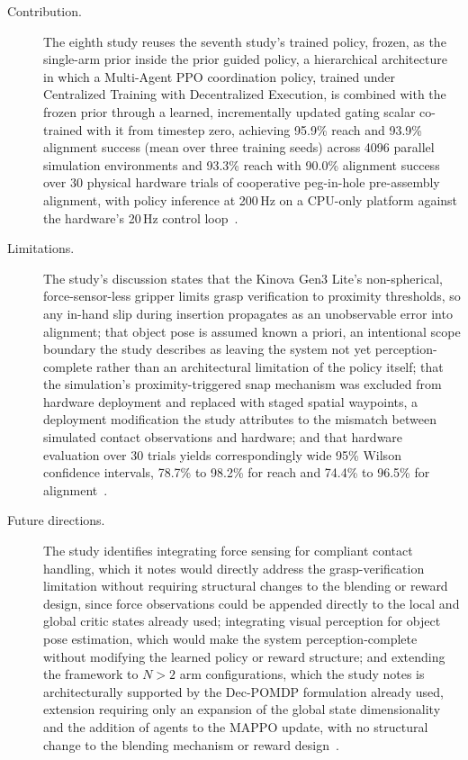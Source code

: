 \begin{description}
    \item[Contribution.] The eighth study reuses the seventh study's trained policy, frozen, as the
    single-arm prior inside the prior guided policy, a hierarchical architecture in which a
    Multi-Agent PPO coordination policy, trained under Centralized Training with Decentralized
    Execution, is combined with the frozen prior through a learned, incrementally updated gating
    scalar co-trained with it from timestep zero, achieving 95.9\% reach and 93.9\% alignment success
    (mean over three training seeds) across 4096 parallel simulation environments and 93.3\% reach with 90.0\% alignment success over
    30 physical hardware trials of cooperative peg-in-hole pre-assembly alignment, with policy
    inference at 200\,Hz on a CPU-only platform against the hardware's 20\,Hz control
    loop~\citep{sk2026priorguided}.

    \item[Limitations.] The study's discussion states that the Kinova Gen3 Lite's non-spherical,
    force-sensor-less gripper limits grasp verification to proximity thresholds, so any in-hand slip
    during insertion propagates as an unobservable error into alignment; that object pose is assumed
    known a priori, an intentional scope boundary the study describes as leaving the system not yet
    perception-complete rather than an architectural limitation of the policy itself; that the
    simulation's proximity-triggered snap mechanism was excluded from hardware deployment and
    replaced with staged spatial waypoints, a deployment modification the study attributes to the
    mismatch between simulated contact observations and hardware; and that hardware evaluation over
    30 trials yields correspondingly wide 95\% Wilson confidence intervals, 78.7\% to 98.2\% for
    reach and 74.4\% to 96.5\% for alignment~\citep{sk2026priorguided}.

    \item[Future directions.] The study identifies integrating force sensing for compliant contact
    handling, which it notes would directly address the grasp-verification limitation without
    requiring structural changes to the blending or reward design, since force observations could be
    appended directly to the local and global critic states already used; integrating visual
    perception for object pose estimation, which would make the system perception-complete without
    modifying the learned policy or reward structure; and extending the framework to $N>2$ arm
    configurations, which the study notes is architecturally supported by the Dec-POMDP formulation
    already used, extension requiring only an expansion of the global state dimensionality and the
    addition of agents to the MAPPO update, with no structural change to the blending mechanism or
    reward design~\citep{sk2026priorguided}.
\end{description}

